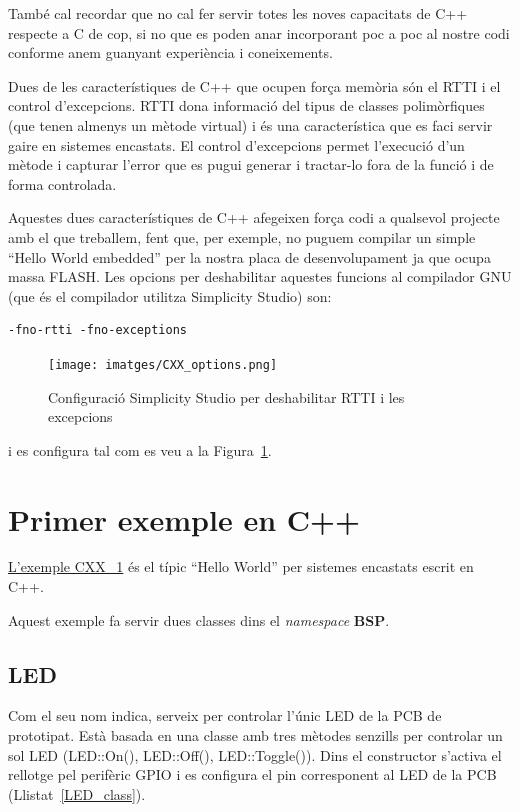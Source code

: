 També cal recordar que no cal fer servir totes les noves capacitats de C++ respecte a C de cop, si no que es poden anar incorporant poc a poc al nostre codi conforme anem guanyant experiència i coneixements.

Dues de les característiques de C++ que ocupen força memòria són el \gls{RTTI} i el control d'excepcions. RTTI dona informació del tipus de classes polimòrfiques (que tenen almenys un mètode virtual) i és una característica que es faci servir gaire en sistemes encastats. El control d'excepcions permet l'execució d'un mètode i capturar l'error que es pugui generar i tractar-lo fora de la funció i de forma controlada.

Aquestes dues característiques de C++ afegeixen força codi a qualsevol projecte amb el que treballem, fent que, per exemple, no puguem compilar un simple ``Hello World embedded'' per la nostra placa de desenvolupament ja que ocupa massa FLASH. Les opcions per deshabilitar aquestes funcions al compilador GNU (que és el compilador utilitza Simplicity Studio) son:
\begin{verbatim}
-fno-rtti -fno-exceptions
\end{verbatim}

\begin{figure}
 \centering
\texttt{[image: imatges/CXX\_options.png]}
 \caption{Configuració Simplicity Studio per deshabilitar RTTI i les excepcions}
 \label{fig:CXX_RTT}
\end{figure}
i es configura tal com es veu a la Figura~\ref{fig:CXX_RTT}.

\section{Primer exemple en C++}
\label{sec:CXX_example}
\href{https://github.com/mariusmm/cursembedded/tree/master/Simplicity/CXX_1}{L'exemple CXX\_1} és el típic ``Hello World'' per sistemes encastats escrit en C++.

Aquest exemple fa servir dues classes dins el {\em namespace} {\bf BSP}.

\subsection{LED}
Com el seu nom indica, serveix per controlar l'únic \gls{LED} de la \gls{PCB} de prototipat. Està basada en una classe amb tres mètodes senzills per controlar un sol LED (LED::On(), LED::Off(), LED::Toggle()).
Dins el constructor s'activa el rellotge pel perifèric \gls{GPIO} i es configura el pin corresponent al LED de la PCB (Llistat~\ref{LED_class}).


